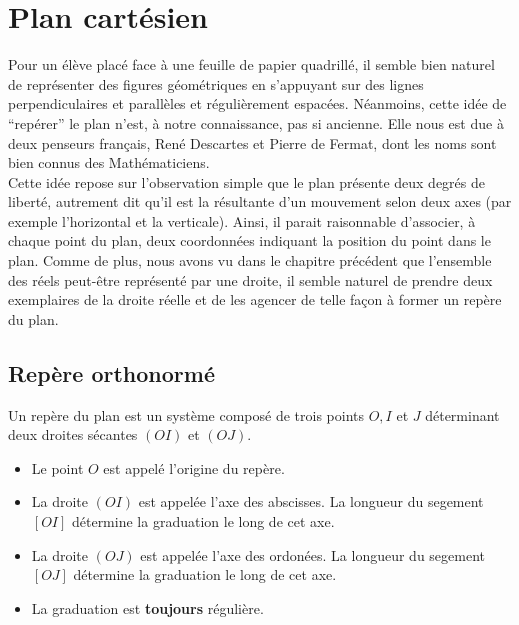\documentclass[a4paper, 12pt]{report}
\begin{document}
\chapter{Plan cartésien}

Pour un élève placé face à une feuille de papier quadrillé, il semble bien naturel de représenter des figures géométriques 
en s'appuyant sur des lignes perpendiculaires et parallèles et régulièrement espacées. 
Néanmoins, cette idée de ``repérer'' le plan n'est, à notre connaissance, pas si ancienne. 
Elle nous est due à deux penseurs français, René Descartes et Pierre de Fermat, dont les noms sont bien connus des Mathématiciens. \\

Cette idée repose sur l'observation simple que le plan présente deux degrés de liberté, 
autrement dit qu'il est la résultante d'un mouvement selon deux axes (par exemple l'horizontal et la verticale). 
Ainsi, il parait raisonnable d'associer, à chaque point du plan, deux coordonnées indiquant la position du point dans le plan.
Comme de plus, nous avons vu dans le chapitre précédent que l'ensemble des réels peut-être représenté par une droite,
il semble naturel de prendre deux exemplaires de la droite réelle et de les agencer de telle façon à former un repère du plan.

\section{Repère orthonormé}

\begin{defn}

Un repère du plan est un système composé de trois points $O, I$ et $J$ déterminant deux droites sécantes
$(OI)$ et $(OJ)$.

	\begin{itemize}
		\item Le point $O$ est appelé l'origine du repère.
		\item La droite $(OI)$ est appelée l'axe des abscisses. La longueur du segement $[OI]$ détermine la graduation 			le long de cet axe.
		\item La droite $(OJ)$ est appelée l'axe des ordonées. La longueur du segement $[OJ]$ détermine la 						graduation le long de cet axe.
		\item La graduation est \textbf{toujours} régulière.
	\end{itemize}
\end{defn}
\end{document}
